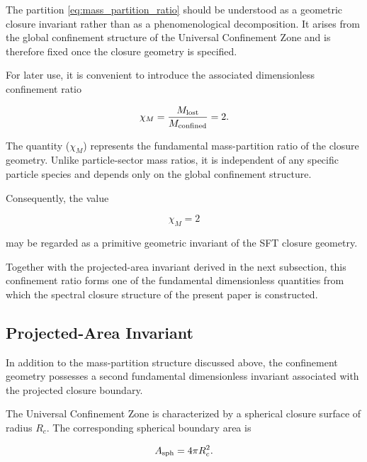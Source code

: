 \documentclass[11pt]{article}
\theoremstyle{definition}
\theoremstyle{remark}
\begin{document}
The partition \eqref{eq:mass_partition_ratio} should be
understood as a geometric closure invariant rather than as a
phenomenological decomposition. It arises from the global
confinement structure of the Universal Confinement Zone and is
therefore fixed once the closure geometry is specified.

For later use, it is convenient to introduce the associated
dimensionless confinement ratio

\begin{equation}
\chi_M = \frac{M_{\rm lost}}
{M_{\rm confined}} = 2.

\label{eq:chi_mass}
\end{equation}

The quantity ($\chi_M$) represents the fundamental mass-partition
ratio of the closure geometry. Unlike particle-sector mass
ratios, it is independent of any specific particle species and
depends only on the global confinement structure.

Consequently, the value

\begin{equation}
\chi_M = 2
\end{equation}

may be regarded as a primitive geometric invariant of the SFT
closure geometry.

Together with the projected-area invariant derived in the next
subsection, this confinement ratio forms one of the fundamental
dimensionless quantities from which the spectral closure
structure of the present paper is constructed.


\subsection{Projected-Area Invariant}
\label{subsec:projected_area_invariant}

In addition to the mass-partition structure discussed above,
the confinement geometry possesses a second fundamental
dimensionless invariant associated with the projected closure
boundary.

The Universal Confinement Zone is characterized by a spherical
closure surface of radius \(R_c\). The corresponding spherical
boundary area is

\begin{equation}
A_{\rm sph} = 4\pi R_c^2.
\label{eq:Asph}
\end{equation}
\end{document}
